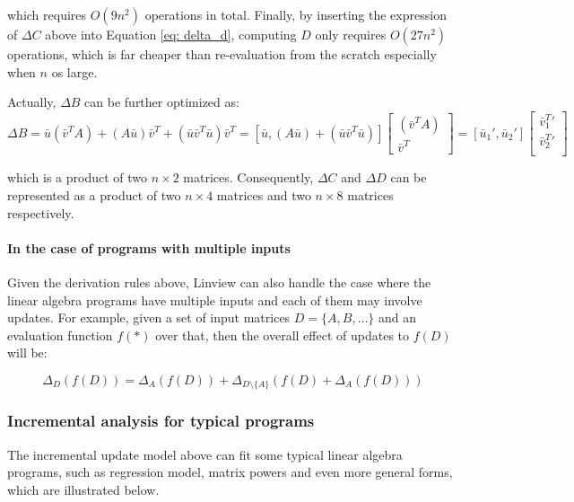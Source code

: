 which requires $O(9n^2)$ operations in total. Finally, by inserting the expression of $\Delta C$ above into Equation \ref{eq: delta_d}, computing $D$ only requires $O(27n^2)$ operations, which is far cheaper than re-evaluation from the scratch especially when $n$ os large.

Actually, $\Delta B$ can be further optimized as:
\begin{equation}\label{eq: update_b_product_opt}
\Delta B = \bar{u}(\bar{v}^TA) + (A\bar{u})\bar{v}^T + (\bar{u}\bar{v}^T\bar{u})\bar{v}^T=[\bar{u}, (A\bar{u}) + (\bar{u}\bar{v}^T\bar{u})]
\begin{bmatrix}
    (\bar{v}^TA)  \\
    \bar{v}^T 
\end{bmatrix}
=[\bar{u}_1', \bar{u}_2']
\begin{bmatrix}
    \bar{v}^T_1'  \\
    \bar{v}^T_2'  \\
\end{bmatrix}
\end{equation}

which is a product of two $n \times 2$ matrices. Consequently, $\Delta C$ and $\Delta D$ can be represented as a product of two $n \times 4$ matrices and two $n \times 8$ matrices respectively.

\paragraph{In the case of programs with multiple inputs}
Given the derivation rules above, Linview can also handle the case where the linear algebra programs have multiple inputs and each of them may involve updates. For example, given a set of input matrices $D=\{A, B, \dots\}$ and an evaluation function $f(*)$ over that, then the overall effect of updates to $f(D)$ will be:

\begin{equation}\label{eq: updates_by_multi_vars}
\Delta_{D}(f(D)) = \Delta_{A}(f(D)) + \Delta_{D \setminus \{A\}}(f(D) + \Delta_{A}(f(D)))
\end{equation}



\subsubsection{Incremental analysis for typical programs}\label{sec: analysis_typical_programs}
The incremental update model above can fit some typical linear algebra programs, such as regression model, matrix powers and even more general forms, which are illustrated below.

